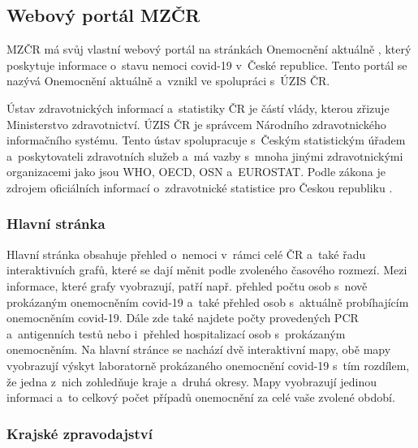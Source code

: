 \subsection{Webový portál MZČR}
MZČR má svůj vlastní webový portál na stránkách Onemocnění aktuálně \cite{onemocneni-aktualne}, který poskytuje informace o~stavu nemoci covid-19 v~České republice. Tento portál se nazývá Onemocnění aktuálně a~vznikl ve spolupráci s~ÚZIS ČR.

Ústav zdravotnických informací a~statistiky ČR je částí vlády, kterou zřizuje Ministerstvo zdravotnictví. ÚZIS ČR je správcem Národního zdravotnického informačního systému. Tento ústav spolupracuje s~Českým statistickým úřadem a~poskytovateli zdravotních služeb a~má vazby s~mnoha jinými zdravotnickými organizacemi jako jsou WHO, OECD, OSN a~EUROSTAT. Podle zákona je zdrojem oficiálních informací o~zdravotnické statistice pro Českou republiku \cite{uzis-definice}.

\subsubsection*{Hlavní stránka}

Hlavní stránka obsahuje přehled o~nemoci v~rámci celé ČR a~také řadu interaktivních grafů, které se dají měnit podle zvoleného časového rozmezí. Mezi informace, které grafy vyobrazují, patří např. přehled počtu osob s~nově prokázaným onemocněním covid-19 a~také přehled osob s~aktuálně probíhajícím onemocněním covid-19. Dále zde také najdete počty provedených PCR a~antigenních testů nebo i~přehled hospitalizací osob s~prokázaným onemocněním. Na hlavní stránce se nachází dvě interaktivní mapy, obě mapy vyobrazují výskyt laboratorně prokázaného onemocnění covid-19 s~tím rozdílem, že jedna z~nich zohledňuje kraje a~druhá okresy. Mapy vyobrazují jedinou informaci a~to celkový počet případů onemocnění za celé vaše zvolené období. 

\subsubsection*{Krajské zpravodajství}

